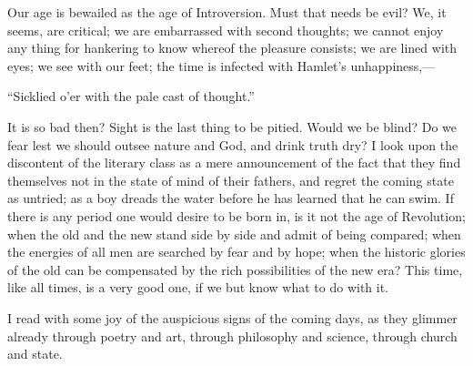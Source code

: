 Our age is bewailed as the age of Introversion. Must that needs be
evil? We, it seems, are critical; we are embarrassed with second
thoughts; we cannot enjoy any thing for hankering to know whereof the
pleasure consists; we are lined with eyes; we see with our feet; the
time is infected with Hamlet's unhappiness,---

\begin{center}\small``Sicklied o'er with the pale cast of
thought.''\end{center}

\noindent It is so bad then? Sight is the last thing to be pitied.
Would we be blind? Do we fear lest we should outsee nature and God,
and drink truth dry? I look upon the discontent of the literary class
as a mere announcement of the fact  that they find
themselves not in the state of mind of their fathers, and regret the
coming state as untried; as a boy dreads the water before he has
learned that he can swim. If there is any period one would desire to
be born in, is it not the age of Revolution; when the old and the new
stand side by side and admit of being compared; when the energies of
all men are searched by fear and by hope; when the historic glories of
the old can be compensated by the rich possibilities of the new era?
This time, like all times, is a very good one, if we but know what to
do with it.

I read with some joy of the auspicious signs of the coming days, as
they glimmer already through poetry and art, through philosophy and
science, through church and state.

